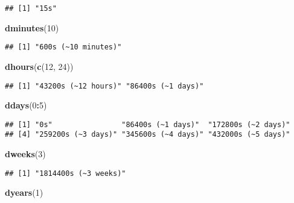\documentclass[
]{article}
\newenvironment{Shaded}{\begin{snugshade}}{\end{snugshade}}
\newcommand{\DecValTok}[1]{\textcolor[rgb]{0.00,0.00,0.81}{#1}}
\newcommand{\FunctionTok}[1]{\textcolor[rgb]{0.13,0.29,0.53}{\textbf{#1}}}
\newcommand{\NormalTok}[1]{#1}
\newcommand{\SpecialCharTok}[1]{\textcolor[rgb]{0.81,0.36,0.00}{\textbf{#1}}}
\begin{document}
\begin{verbatim}
## [1] "15s"
\end{verbatim}

\begin{Shaded}
\begin{Highlighting}[]
\FunctionTok{dminutes}\NormalTok{(}\DecValTok{10}\NormalTok{)}
\end{Highlighting}
\end{Shaded}

\begin{verbatim}
## [1] "600s (~10 minutes)"
\end{verbatim}

\begin{Shaded}
\begin{Highlighting}[]
\FunctionTok{dhours}\NormalTok{(}\FunctionTok{c}\NormalTok{(}\DecValTok{12}\NormalTok{, }\DecValTok{24}\NormalTok{))}
\end{Highlighting}
\end{Shaded}

\begin{verbatim}
## [1] "43200s (~12 hours)" "86400s (~1 days)"
\end{verbatim}

\begin{Shaded}
\begin{Highlighting}[]
\FunctionTok{ddays}\NormalTok{(}\DecValTok{0}\SpecialCharTok{:}\DecValTok{5}\NormalTok{)}
\end{Highlighting}
\end{Shaded}

\begin{verbatim}
## [1] "0s"                "86400s (~1 days)"  "172800s (~2 days)"
## [4] "259200s (~3 days)" "345600s (~4 days)" "432000s (~5 days)"
\end{verbatim}

\begin{Shaded}
\begin{Highlighting}[]
\FunctionTok{dweeks}\NormalTok{(}\DecValTok{3}\NormalTok{)}
\end{Highlighting}
\end{Shaded}

\begin{verbatim}
## [1] "1814400s (~3 weeks)"
\end{verbatim}

\begin{Shaded}
\begin{Highlighting}[]
\FunctionTok{dyears}\NormalTok{(}\DecValTok{1}\NormalTok{)}
\end{Highlighting}
\end{Shaded}
\end{document}
